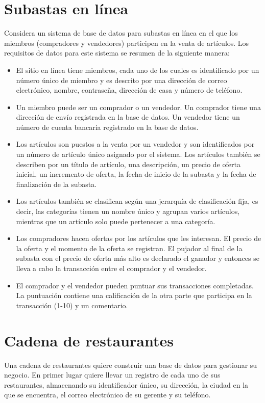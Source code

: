 \documentclass{db-practice}
\begin{document}
\section{Subastas en línea}
Considera un sistema de base de datos para subastas en línea en el que los miembros (compradores y vendedores) participen en la venta de artículos. Los requisitos de datos para este sistema se resumen de la siguiente manera: 
\begin{itemize}
    \item El sitio en línea tiene miembros, cada uno de los cuales es identificado por un número único de miembro y es descrito por una dirección de correo electrónico, nombre, contraseña, dirección de casa y número de teléfono.
    \item Un miembro puede ser un comprador o un vendedor. Un comprador tiene una dirección de envío registrada en la base de datos. Un vendedor tiene un número de cuenta bancaria registrado en la base de datos.
    \item Los artículos son puestos a la venta por un vendedor y son identificados por un número de artículo único asignado por el sistema. Los artículos también se describen por un título de artículo, una descripción, un precio de oferta inicial, un incremento de oferta, la fecha de inicio de la subasta y la fecha de finalización de la subasta. 
    \item Los artículos también se clasifican según una jerarquía de clasificación fija, es decir, las categorías tienen un nombre único y agrupan varios artículos, mientras que un artículo solo puede pertenecer a una categoría.
    \item Los compradores hacen ofertas por los artículos que les interesan. El precio de la oferta y el momento de la oferta se registran. El pujador al final de la subasta con el precio de oferta más alto es declarado el ganador y entonces se lleva a cabo la transacción entre el comprador y el vendedor.
    \item El comprador y el vendedor pueden puntuar sus transacciones completadas. La puntuación contiene una calificación de la otra parte que participa en la transacción (1-10) y un comentario.
\end{itemize}

\section{Cadena de restaurantes}
Una cadena de restaurantes quiere construir una base de datos para gestionar su negocio. En primer lugar quiere llevar un registro de cada uno de sus restaurantes, almacenando su identificador único, su dirección, la ciudad en la que se encuentra, el correo electrónico de su gerente y su teléfono.
\end{document}
